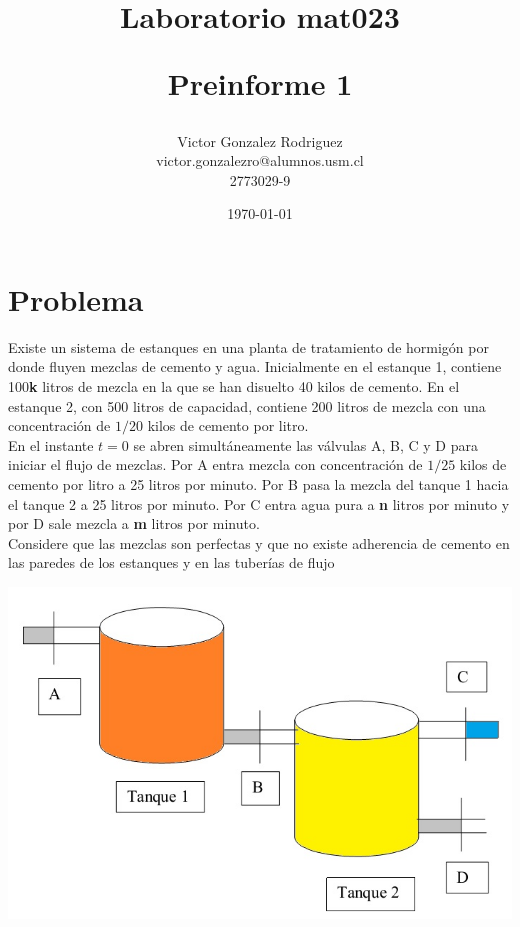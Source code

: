 \documentclass[12pt,letterpaper]{article}
\begin{document}
\title{Laboratorio mat023 \\ \begin{Large}Preinforme 1\end{Large}} 
\author{Victor Gonzalez Rodriguez\\victor.gonzalezro@alumnos.usm.cl\\2773029-9}
\date{\today}
\maketitle

\section{Problema}

Existe un sistema de estanques en una planta de tratamiento de hormigón por donde fluyen mezclas de cemento y agua. Inicialmente en el estanque 1, contiene 100\textbf{k} litros de mezcla en la que se han disuelto 40 kilos de cemento. En el estanque 2, con 500 litros de capacidad, contiene 200 litros de mezcla con una concentración de $1/20$ kilos de cemento por litro.
\\

En el instante $t = 0$ se abren simultáneamente las válvulas A, B, C y D para iniciar el flujo de mezclas.
Por A entra mezcla con concentración de $1/25$ kilos de cemento por litro a 25 litros por minuto. Por B pasa la mezcla del tanque 1 hacia el tanque 2 a 25 litros por minuto. Por C entra agua pura a \textbf{n} litros por minuto y por D sale mezcla a \textbf{m} litros por minuto.
\\

Considere que las mezclas son perfectas y que no existe adherencia de cemento en las paredes de los
estanques y en las tuberías de flujo

\includegraphics[width=\textwidth]{modelo.png}
\end{document}
